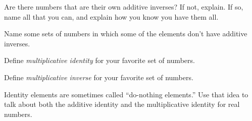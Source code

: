\documentclass[space,handout,nooutcomes]{ximera}
\begin{document}
\begin{question}
Are there numbers that are their own additive inverses?  If not,
explain.  If so, name all that you can, and explain how you know you
have them all.
\end{question}

\begin{question}
Name some sets of numbers in which some of the elements don't have
additive inverses.
\end{question}

\begin{question}Define \emph{multiplicative identity} for your favorite set of numbers.  
\end{question}

\begin{question}Define \emph{multiplicative inverse} for your favorite set of numbers.  
\end{question}

\begin{question}Identity elements are sometimes called ``do-nothing elements.''  Use that idea to talk about both the additive identity and the multiplicative identity for real numbers.  
\end{question}
\end{document}
